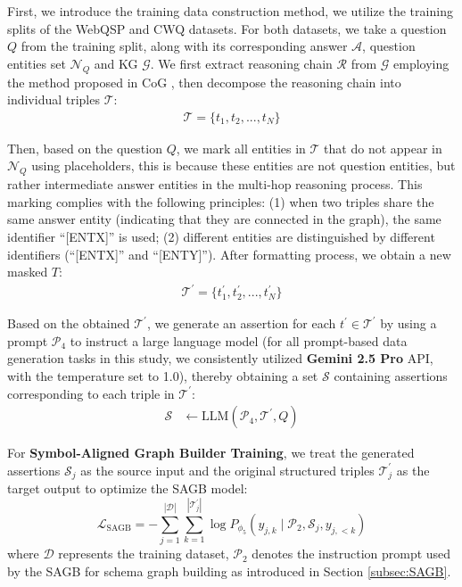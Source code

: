 \documentclass[11pt]{article}
\begin{document}
First, we introduce the training data construction method, we utilize the training splits of the WebQSP and CWQ datasets. For both datasets, we take a question $Q$ from the training split, along with its corresponding answer $\mathcal{A}$, question entities set $\mathcal{N}_Q$ and KG $\mathcal{G}$. We first extract reasoning chain $\mathcal{R}$ from $\mathcal{G}$ employing the method proposed in CoG \cite{zhao-etal-2025-correcting}, then decompose the reasoning chain into individual triples $\mathcal{T}$:
\begin{align}
\mathcal{T}=\{t_1, t_2, ..., t_N\}
\end{align}

Then, based on the question $Q$, we mark all entities in $\mathcal{T}$ that do not appear in $\mathcal{N}_Q$ using placeholders, this is because these entities are not question entities, but rather intermediate answer entities in the multi-hop reasoning process. This marking complies with the following principles: (1) when two triples share the same answer entity (indicating that they are connected in the graph), the same identifier ``[ENTX]'' is used; (2) different entities are distinguished by different identifiers (``[ENTX]'' and ``[ENTY]''). After formatting process, we obtain a new masked $T$:
\begin{align}
\mathcal{T}^{'}=\{t^{'}_1, t^{'}_2, ..., t^{'}_N\}
\end{align}

Based on the obtained $\mathcal{T}^{'}$, we generate an assertion for each $t^{'} \in \mathcal{T}^{'}$ by using a prompt \hyperref[fig:p4]{\( \mathcal{P}_4 \)} to instruct a large language model (for all prompt-based data generation tasks in this study, we consistently utilized \textbf{Gemini 2.5 Pro} \cite{comanici2025gemini} API, with the temperature set to 1.0), thereby obtaining a set $\mathcal{S}$ containing assertions corresponding to each triple in $\mathcal{T}^{'}$:
\begin{align}
\mathcal{S}&\leftarrow \text{LLM}(\mathcal{P}_4, \mathcal{T}^{'}, Q)
\end{align}

For \textbf{Symbol-Aligned Graph Builder Training}, we treat the generated assertions $\mathcal{S}_j$ as the source input and the original structured triples $\mathcal{T}^{'}_j$ as the target output to optimize the SAGB model:
\begin{equation}
    \mathcal{L}_{\text{SAGB}} = - \sum_{j=1}^{|\mathcal{D}|} \sum_{k=1}^{|\mathcal{T}^{'}_j|} \log P_{\phi_5}(y_{j,k} \mid \mathcal{P}_2, \mathcal{S}_j, y_{j,<k})
\end{equation}
where $\mathcal{D}$ represents the training dataset, \hyperref[fig:p2]{$ \mathcal{P}_2 $} denotes the instruction prompt used by the SAGB for schema graph building as introduced in Section \ref{subsec:SAGB}.
\end{document}
